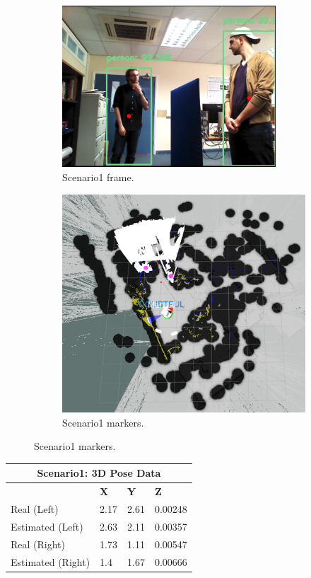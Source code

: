 \begin{figure}[H]
    \begin{subfigure}{.5\textwidth}
        \centering
        \includegraphics[width=8cm]{images/chapter6_scenario2.png}
        \caption{Scenario1 frame.}
        \label{2a}
	\end{subfigure}
    \begin{subfigure}{.5\textwidth}
        \centering
        \includegraphics[width=.9\linewidth]{images/chapter6_rviz_extend2.png}
        \caption{Scenario1 markers.}
        \label{2b}
	\end{subfigure}
\end{figure}

\begin{table}[H]
  \centering
  \begin{tabular}{ |p{4cm}|p{2cm}|p{2cm}|p{2cm}|  }
    \hline
    \multicolumn{4}{|c|}{Scenario1: 3D Pose Data} \\
    \hline
    & \textbf{X} & \textbf{Y} & \textbf{Z} \\
    \hline
    Real (Left) & 2.17 & 2.61 & 0.00248 \\
    Estimated (Left) & 2.63 & 2.11 & 0.00357 \\
    \hline
    Real (Right) & 1.73 & 1.11 & 0.00547 \\
    Estimated (Right) & 1.4 & 1.67 & 0.00666 \\
    \hline
  \end{tabular}
\end{table}
\clearpage

